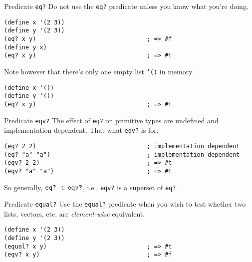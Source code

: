 \documentclass[presentation]{beamer}
\begin{document}
\begin{frame}[fragile,label={sec:orgheadline20}]{Predicate \texttt{eq?}}
 Do not use the \texttt{eq?} predicate unless you know what you're doing.

\begin{verbatim}
(define x '(2 3))
(define y '(2 3))
(eq? x y)                               ; => #f
(define y x)
(eq? x y)                               ; => #t
\end{verbatim}

Note however that there's only one empty list \texttt{​'()} in memory.

\begin{verbatim}
(define x '())
(define y '())
(eq? x y)                               ; => #t
\end{verbatim}
\end{frame}

\begin{frame}[fragile,label={sec:orgheadline21}]{Predicate \texttt{eqv?}}
 The effect of \texttt{eq?} on primitive types are undefined and
implementation dependent.  That what \texttt{eqv?} is for.

\begin{verbatim}
(eq? 2 2)                               ; implementation dependent
(eq? "a" "a")                           ; implementation dependent
(eqv? 2 2)                              ; => #t
(eqv? "a" "a")                          ; => #t
\end{verbatim}

So generally, \(\text{\texttt{eq?} }\in\text{\texttt{eqv?}}\),
i.e., \texttt{eqv?} is a superset of \texttt{eq?}.
\end{frame}

\begin{frame}[fragile,label={sec:orgheadline22}]{Predicate \texttt{equal?}}
 Use the \texttt{equal?} predicate when you wish to test whether two lists,
vectors, etc. are \emph{element-wise} equivalent.

\begin{verbatim}
(define x '(2 3))
(define y '(2 3))
(equal? x y)                            ; => #t
(eqv? x y)                              ; => #f
\end{verbatim}
\end{frame}
\end{document}
